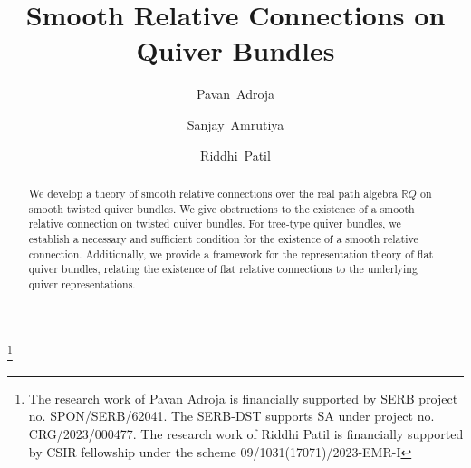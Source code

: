 \documentclass[12pt, reqno]{amsart}
\theoremstyle{plain}
\numberwithin{equation}{section}
\begin{document}
\baselineskip=15.5pt

\title{Smooth Relative Connections on Quiver Bundles}
\author{Pavan~Adroja}
\address{Department of Mathematics, IIT Gandhinagar,
 Near Village Palaj, Gandhinagar - 382355, India}
\author{Sanjay~Amrutiya}
\address{Department of Mathematics, IIT Gandhinagar,
 Near Village Palaj, Gandhinagar - 382355, India}
 \author{Riddhi~Patil}
\address{Department of Mathematics, IIT Gandhinagar,
 Near Village Palaj, Gandhinagar - 382355, India}
\thanks{The research work of Pavan Adroja is financially supported by SERB project no. SPON/SERB/62041. The SERB-DST supports SA under project no. CRG/2023/000477. The research work of Riddhi Patil is financially supported by CSIR fellowship under the scheme 09/1031(17071)/2023-EMR-I}
\date{}

\begin{abstract}
We develop a theory of smooth relative connections over the real path algebra $\mathbb{R}Q$ on smooth twisted quiver bundles. We give obstructions to the existence of a smooth relative connection on twisted quiver bundles. For tree-type quiver bundles, we establish a necessary and sufficient condition for the existence of a smooth relative connection. Additionally, we provide a framework for the representation theory of flat quiver bundles, relating the existence of flat relative connections to the underlying quiver representations.
\end{abstract}



\maketitle
\end{document}
